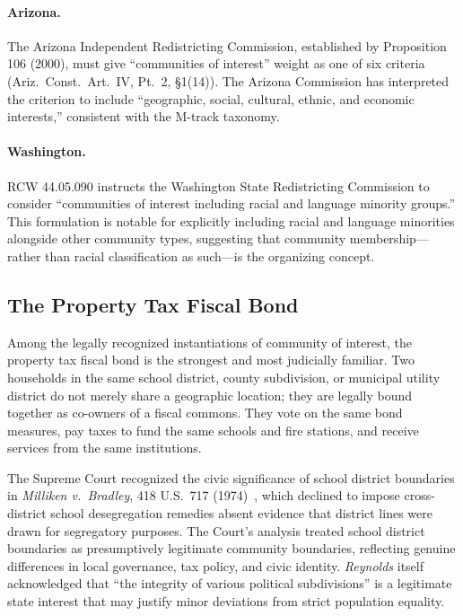\paragraph{Arizona.}
The Arizona Independent Redistricting Commission, established by Proposition 106
(2000), must give ``communities of interest'' weight as one of six criteria
(Ariz.\ Const.\ Art.\ IV, Pt.\ 2, \S1(14)).
The Arizona Commission has interpreted the criterion to include ``geographic, social,
cultural, ethnic, and economic interests,'' consistent with the M-track taxonomy.

\paragraph{Washington.}
RCW 44.05.090 instructs the Washington State Redistricting Commission to consider
``communities of interest including racial and language minority groups.''
This formulation is notable for explicitly including racial and language minorities
alongside other community types, suggesting that community membership---rather than
racial classification as such---is the organizing concept.

\subsection{The Property Tax Fiscal Bond}

Among the legally recognized instantiations of community of interest, the property
tax fiscal bond is the strongest and most judicially familiar.
Two households in the same school district, county subdivision, or municipal utility
district do not merely share a geographic location; they are legally bound together
as co-owners of a fiscal commons.
They vote on the same bond measures, pay taxes to fund the same schools and fire
stations, and receive services from the same institutions.

The Supreme Court recognized the civic significance of school district boundaries
in \textit{Milliken v.\ Bradley}, 418 U.S.\ 717 (1974)~\citep{milliken1974},
which declined to impose cross-district school desegregation remedies absent
evidence that district lines were drawn for segregatory purposes.
The Court's analysis treated school district boundaries as presumptively legitimate
community boundaries, reflecting genuine differences in local governance, tax policy,
and civic identity.
\textit{Reynolds} itself acknowledged that ``the integrity of various political
subdivisions'' is a legitimate state interest that may justify minor deviations
from strict population equality.

